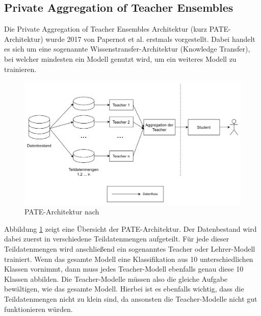 \subsection{Private Aggregation of Teacher Ensembles}\label{sec:pate}

Die Private Aggregation of Teacher Ensembles Architektur (kurz PATE-Architektur) wurde 2017 von Papernot et al. \cite{P-57} erstmals vorgestellt.
Dabei handelt es sich um eine sogenannte Wissenstransfer-Architektur (Knowledge Transfer), bei welcher mindesten ein Modell genutzt wird, um ein weiteres Modell zu trainieren.

\begin{figure}[!htb]
    \centering
    \includegraphics[width=15cm]{figures/pate_basic.png}
    \caption{PATE-Architektur nach \cite{P-57}}
    \label{fig:pate_basic}
\end{figure} 

Abbildung \ref{fig:pate_basic} zeigt eine Übersicht der PATE-Architektur.
Der Datenbestand wird dabei zuerst in verschiedene Teildatenmengen aufgeteilt. 
Für jede dieser Teildatenmengen wird anschließend ein sogenanntes Teacher oder Lehrer-Modell trainiert.
Wenn das gesamte Modell eine Klassifikation aus 10 unterschiedlichen Klassen vornimmt, dann muss jedes Teacher-Modell ebenfalls genau diese 10 Klassen abbilden.
Die Teacher-Modelle müssen also die gleiche Aufgabe bewältigen, wie das gesamte Modell.
Hierbei ist es ebenfalls wichtig, dass die Teildatenmengen nicht zu klein sind, da ansonsten die Teacher-Modelle nicht gut funktionieren würden.

